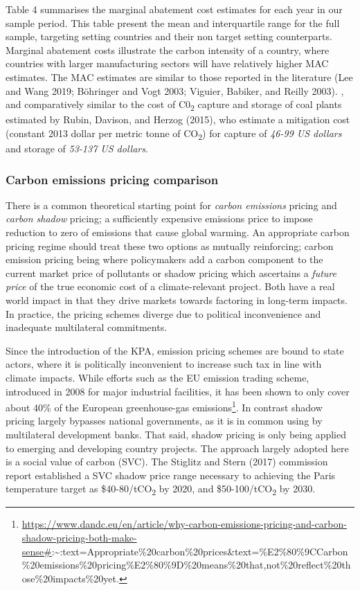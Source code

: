 \documentclass[
  10pt,
]{article}
\begin{document}
Table 4 summarises the marginal abatement cost estimates for each year
in our sample period. This table present the mean and interquartile
range for the full sample, targeting setting countries and their non
target setting counterparts. Marginal abatement costs illustrate the
carbon intensity of a country, where countries with larger manufacturing
sectors will have relatively higher MAC estimates. The MAC estimates are
similar to those reported in the literature (Lee and Wang 2019;
Böhringer and Vogt 2003; Viguier, Babiker, and Reilly 2003). , and
comparatively similar to the cost of C0\textsubscript{2} capture and
storage of coal plants estimated by Rubin, Davison, and Herzog (2015),
who estimate a mitigation cost (constant 2013 dollar per metric tonne of
CO\textsubscript{2}) for capture of \emph{46-99 US dollars} and storage
of \emph{53-137 US dollars}.

\hypertarget{carbon-emissions-pricing-comparison}{%
\subsubsection{Carbon emissions pricing
comparison}\label{carbon-emissions-pricing-comparison}}

There is a common theoretical starting point for \emph{carbon emissions}
pricing and \emph{carbon shadow} pricing; a sufficiently expensive
emissions price to impose reduction to zero of emissions that cause
global warming. An appropriate carbon pricing regime should treat these
two options as mutually reinforcing; carbon emission pricing being where
policymakers add a carbon component to the current market price of
pollutants or shadow pricing which ascertains a \emph{future price} of
the true economic cost of a climate-relevant project. Both have a real
world impact in that they drive markets towards factoring in long-term
impacts. In practice, the pricing schemes diverge due to political
inconvenience and inadequate multilateral commitments.

Since the introduction of the KPA, emission pricing schemes are bound to
state actors, where it is politically inconvenient to increase such tax
in line with climate impacts. While efforts such as the EU emission
trading scheme, introduced in 2008 for major industrial facilities, it
has been shown to only cover about 40\% of the European greenhouse-gas
emissions\footnote{\url{https://www.dandc.eu/en/article/why-carbon-emissions-pricing-and-carbon-shadow-pricing-both-make-sense\#}:\textasciitilde:text=Appropriate\%20carbon\%20prices\&text=\%E2\%80\%9CCarbon\%20emissions\%20pricing\%E2\%80\%9D\%20means\%20that,not\%20reflect\%20those\%20impacts\%20yet.}.
In contrast shadow pricing largely bypasses national governments, as it
is in common using by multilateral development banks. That said, shadow
pricing is only being applied to emerging and developing country
projects. The approach largely adopted here is a social value of carbon
(SVC). The Stiglitz and Stern (2017) commission report established a SVC
shadow price range necessary to achieving the Paris temperature target
as \$40-80/tCO\textsubscript{2} by 2020, and
\$50-100/tCO\textsubscript{2} by 2030.
\end{document}
